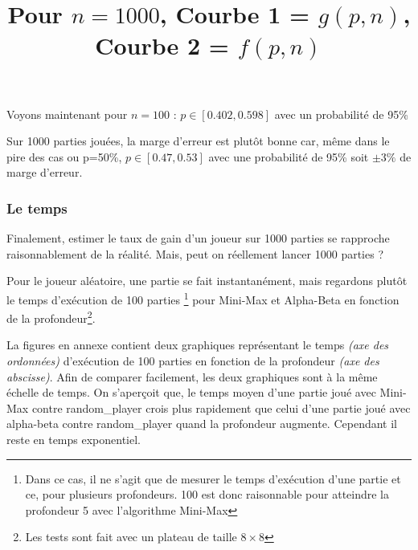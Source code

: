\documentclass{report}
\begin{document}
Voyons maintenant pour $n=100$ : $p\in[0.402,0.598]$ avec un probabilité de 95\%\newline

\begin{center}
\begin{center}
    \title{Pour $n=1000$, Courbe 1 = $g(p,n)$, Courbe 2 = $f(p,n)$}
\end{center}
\end{center}

Sur 1000 parties jouées, la marge d'erreur est plutôt bonne car, même dans le pire des cas ou p=50\%, $p\in[0.47,0.53]$ avec une probabilité de 95\% soit $\pm3\%$ de marge d'erreur.\newline

\subsubsection{Le temps}

Finalement, estimer le taux de gain d'un joueur sur 1000 parties se rapproche raisonnablement de la réalité. Mais, peut on réellement lancer 1000 parties ?

Pour le joueur aléatoire, une partie se fait instantanément, mais regardons plutôt le temps d'exécution de 100 parties \footnote{Dans ce cas, il ne s'agit que de mesurer le temps d'exécution d'une partie et ce, pour plusieurs profondeurs. 100 est donc raisonnable pour atteindre la profondeur 5 avec l'algorithme Mini-Max} pour Mini-Max et Alpha-Beta en fonction de la profondeur\footnote{Les tests sont fait avec un plateau de taille $8\times8$}.\newline


La figures en annexe contient deux graphiques représentant le temps \textit{(axe des ordonnées)} d'exécution de 100 parties en fonction de la profondeur \textit{(axe des abscisse)}. Afin de comparer facilement, les deux graphiques sont à la même échelle de temps. On s'aperçoit que, le temps moyen d'une partie joué avec Mini-Max contre random\_player crois plus rapidement que celui d'une partie joué avec alpha-beta contre random\_player quand la profondeur augmente. Cependant il reste en temps exponentiel.
\end{document}
